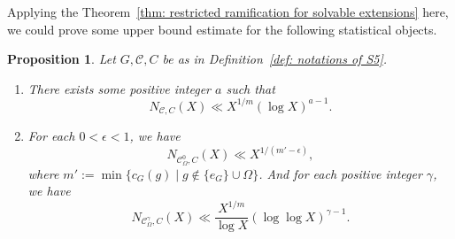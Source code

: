 \documentclass[12pt,a4paper]{amsart}
\numberwithin{equation}{section}%
\theoremstyle{plain}%
\newtheorem{proposition}[theorem]{Proposition}%
\theoremstyle{definition}%
\theoremstyle{remark}%
\begin{document}
    Applying the Theorem~\ref{thm: restricted ramification for solvable extensions} here, we could prove some upper bound estimate for the following statistical objects.
    \begin{proposition}\label{prop: moment for solvable extensions} 
    	Let $G,\mathcal{C},C$ be as in Definition~\ref{def: notations of S5}.
    	\begin{enumerate}
    		\item There exists some positive integer $a$ such that
    		\begin{equation*}
    			N_{\mathcal{C},C}(X)\ll X^{1/m}(\log X)^{a-1}.
    		\end{equation*}
    		\item For each $0<\epsilon<1$, we have
    		\begin{equation*}
    			N_{\mathcal{C}_{\Omega}^{0},C}(X)\ll X^{1/(m'-\epsilon)},
    		\end{equation*}
    		where $m':=\min\{c_{G}(g)\mid g\notin\{e_{G}\}\cup\Omega\}$.
    		And for each positive integer $\gamma$, we have
    		\begin{equation*}
    			N_{\mathcal{C}_{\Omega}^{\gamma},C}(X)\ll\frac{X^{1/m}}{\log X}(\log\log X)^{\gamma-1}.
    		\end{equation*}
    	\end{enumerate}
    \end{proposition}
\end{document}
